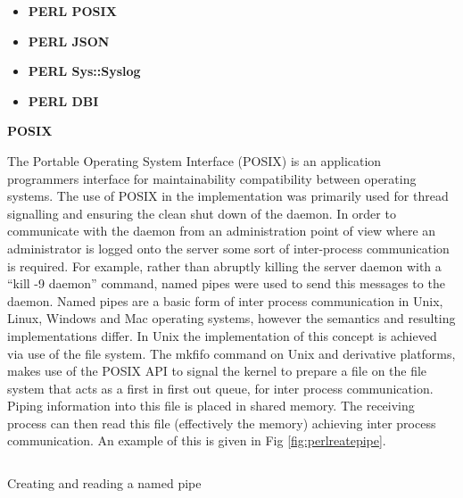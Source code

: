 			\begin{itemize}[itemsep=1pt,parsep=1pt]
				\item \textbf{PERL POSIX}						
				\item \textbf{PERL JSON}	
				\item \textbf{PERL Sys::Syslog}							
				\item \textbf{PERL DBI}							
			\end{itemize}
			
		\vspace{3mm}
		\large{\bfseries{POSIX}}
		
		\normalsize
		{
			The Portable Operating System Interface (POSIX) is an application programmers interface for maintainability compatibility between operating systems.  
			The use of POSIX in the implementation was primarily used for thread signalling and ensuring the clean shut down of the daemon.  
			\newline
			\newline
			In order to communicate with the daemon from an administration point of view
			where an administrator is logged onto the server some sort of inter-process communication is required.  For example, 
			rather than abruptly killing the server daemon with a ``kill -9 daemon'' command, named pipes were
			used to send this messages to the daemon.
			\newline
			\newline
			Named pipes are a basic form of inter process communication in Unix, Linux, Windows and Mac operating systems, however the semantics and resulting implementations differ.
			In Unix the implementation of this concept is achieved via use of the file system.  
			\newline
			\newline
			The mkfifo command on Unix and derivative platforms, makes use of the POSIX API to signal the kernel to
			prepare a file on the file system that acts as a first in first out queue, for inter process communication.  Piping information into this file is placed in shared memory. 
			The receiving process can then read this file (effectively the memory) achieving inter process communication.
			An example of this is given in Fig \ref{fig:perlreatepipe}.
		}
		
\newpage
						
		\begin{figurehere}
			\inputminted[linenos=true,fontsize=\footnotesize,tabsize=2]{perl}{pages/chapter3/smippets/perlfifo.pl}
			\vspace{-2mm}
			\caption{Creating and reading a named pipe}
			\label{fig:perlreatepipe}
		\end{figurehere}
		

